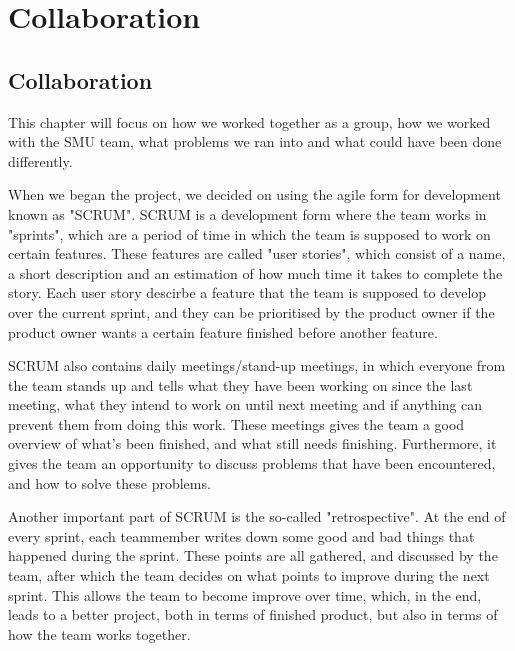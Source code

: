 \chapter{Collaboration}
\section{Collaboration}
This chapter will focus on how we worked together as a group, how we worked with the SMU team, what problems we ran into and what could have been done differently.

When we began the project, we decided on using the agile form for development known as "SCRUM". SCRUM is a development form where the team works in "sprints", which are a period of time in which the team is supposed to work on certain features. These features are called "user stories", which consist of a name, a short description and an estimation of how much time it takes to complete the story. Each user story descirbe a feature that the team is supposed to develop over the current sprint, and they can be prioritised by the product owner if the product owner wants a certain feature finished before another feature.

SCRUM also contains daily meetings/stand-up meetings, in which everyone from the team stands up and tells what they have been working on since the last meeting, what they intend to work on until next meeting and if anything can prevent them from doing this work. These meetings gives the team a good overview of what's been finished, and what still needs finishing. Furthermore, it gives the team an opportunity to discuss problems that have been encountered, and how to solve these problems.

Another important part of SCRUM is the so-called "retrospective". At the end of every sprint, each teammember writes down some good and bad things that happened during the sprint. These points are all gathered, and discussed by the team, after which the team decides on what points to improve during the next sprint. This allows the team to become improve over time, which, in the end, leads to a better project, both in terms of finished product, but also in terms of how the team works together.

